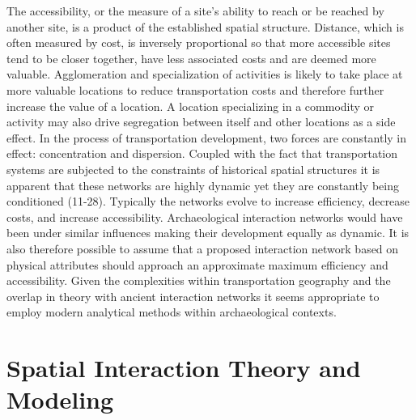\documentclass[12pt,a4paper]{thesis}
\begin{document}
The accessibility, or the measure of a site's ability to reach or be reached by another site, is a product of the established spatial structure. Distance, which is often measured by cost, is inversely proportional so that more accessible sites tend to be closer together, have less associated costs and are deemed more valuable. Agglomeration and specialization of activities is likely to take place at more valuable locations to reduce transportation costs and therefore further increase the value of a location. A location specializing in a commodity or activity may also drive segregation between itself and other locations as a side effect. In the process of transportation development, two forces are constantly in effect: concentration and dispersion. Coupled with the fact that transportation systems are subjected to the constraints of historical spatial structures it is apparent that these networks are highly dynamic yet they are constantly being conditioned (11-28). Typically the networks evolve to increase efficiency, decrease costs, and increase accessibility. Archaeological interaction networks would have been under similar influences making their development equally as dynamic. It is also therefore possible to assume that a proposed interaction network based on physical attributes should approach an approximate maximum efficiency and accessibility. Given the complexities within transportation geography and the overlap in theory with ancient interaction networks it seems appropriate to employ modern analytical methods within archaeological contexts.



\section{Spatial Interaction Theory and Modeling}
\end{document}

